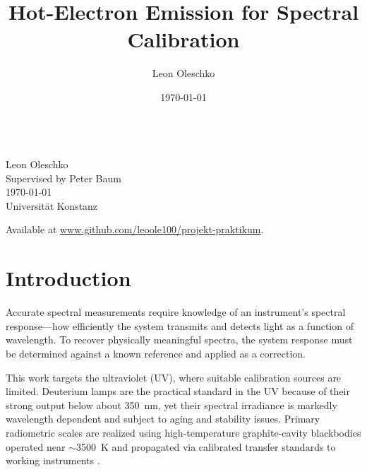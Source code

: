\documentclass[
	parskip=half,
	a4paper,
]{scrarticle}
\begin{document}
\title{Hot-Electron Emission for Spectral Calibration}
\author{Leon Oleschko}
\date{\dotdate\today}

\begin{titlepage}
    \sffamily
    \vspace*{3cm}
    {
        \fontsize{32}{32}
    }
    \vspace{.25cm}\\
    {
        \Large
        Leon Oleschko\\
        Supervised by Peter Baum
        \vspace{.05cm}\\
        \dotdate\today\\
        Universität Konstanz
    }
    \vfill
    {
        \normalfont\normalsize

    }
    \vfill
    \begin{flushright}
        Available at \url{www.github.com/leoole100/projekt-praktikum}.
    \end{flushright}
\end{titlepage}


\clearpage

\section{Introduction}
Accurate spectral measurements require knowledge of an instrument’s spectral response—how efficiently the system transmits and detects light as a function of wavelength. To recover physically meaningful spectra, the system response must be determined against a known reference and applied as a correction.

This work targets the ultraviolet (UV), where suitable calibration sources are limited. Deuterium lamps are the practical standard in the UV because of their strong output below about \SI{350}{\nano\metre}, yet their spectral irradiance is markedly wavelength dependent and subject to aging and stability issues. Primary radiometric scales are realized using high-temperature graphite-cavity blackbodies operated near $\sim$\SI{3500}{\kelvin} and propagated via calibrated transfer standards to working instruments \cite{yoon_nist_2011,sapritsky_black-body_1995}.
\end{document}

